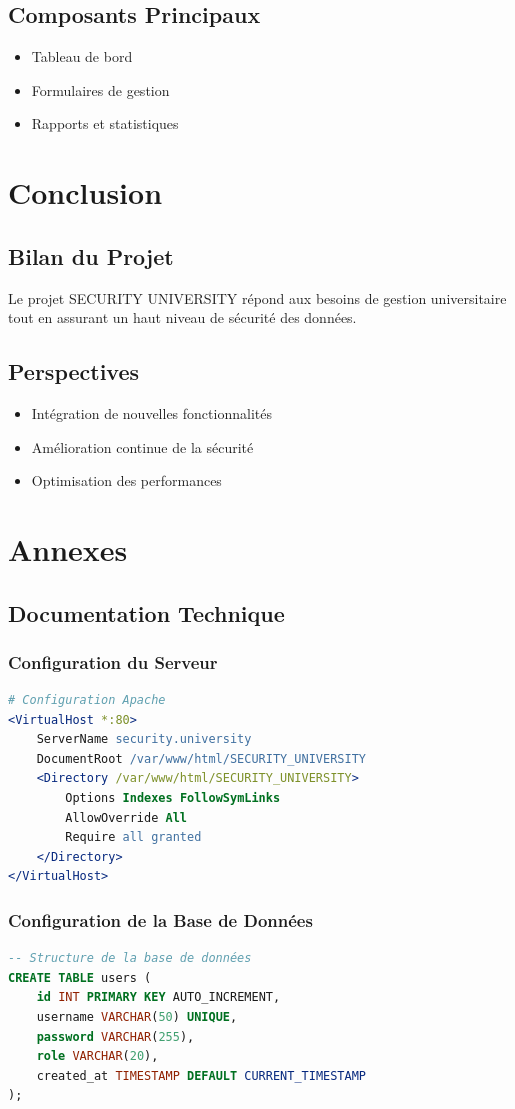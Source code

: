 \documentclass[12pt,a4paper]{report}
\begin{document}
\section{Composants Principaux}
\begin{itemize}
    \item Tableau de bord
    \item Formulaires de gestion
    \item Rapports et statistiques
\end{itemize}

\chapter{Conclusion}
\section{Bilan du Projet}
Le projet SECURITY UNIVERSITY répond aux besoins de gestion universitaire tout en assurant un haut niveau de sécurité des données.

\section{Perspectives}
\begin{itemize}
    \item Intégration de nouvelles fonctionnalités
    \item Amélioration continue de la sécurité
    \item Optimisation des performances
\end{itemize}

\appendix
\chapter{Annexes}
\section{Documentation Technique}
\subsection{Configuration du Serveur}
\begin{lstlisting}[language=apache]
# Configuration Apache
<VirtualHost *:80>
    ServerName security.university
    DocumentRoot /var/www/html/SECURITY_UNIVERSITY
    <Directory /var/www/html/SECURITY_UNIVERSITY>
        Options Indexes FollowSymLinks
        AllowOverride All
        Require all granted
    </Directory>
</VirtualHost>
\end{lstlisting}

\subsection{Configuration de la Base de Données}
\begin{lstlisting}[language=sql]
-- Structure de la base de données
CREATE TABLE users (
    id INT PRIMARY KEY AUTO_INCREMENT,
    username VARCHAR(50) UNIQUE,
    password VARCHAR(255),
    role VARCHAR(20),
    created_at TIMESTAMP DEFAULT CURRENT_TIMESTAMP
);
\end{lstlisting}
\end{document}
